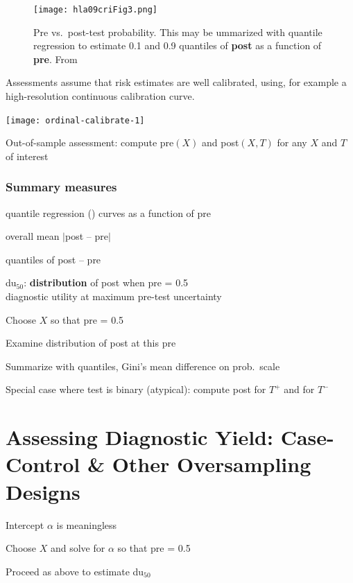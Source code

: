\begin{figure}[!htbp]\leavevmode
\centerline{\texttt{[image: hla09criFig3.png]}}
\caption{Pre vs.\ post-test probability.  This may be ummarized with quantile regression to estimate 0.1 and 0.9 quantiles of \textbf{post} as a function of \textbf{pre}.  From~\citet{hla09cri}}
\end{figure}

Assessments assume that risk estimates are well calibrated, using, for example a high-resolution continuous calibration curve.

\centerline{\texttt{[image: ordinal-calibrate-1]}}

Out-of-sample assessment: compute pre$(X)$ and post$(X,T)$ for
any $X$ and $T$ of interest
\subsubsection{Summary measures}
 \bi
 \item quantile regression {\smaller[2](\cite{koe78reg})} curves as a function of pre
 \item overall mean $|$post -- pre$|$
 \item quantiles of post -- pre
 \item du$_{50}$: \textbf{distribution} of post when pre = 0.5 \\
 diagnostic utility at maximum pre-test uncertainty 
  \bi
  \item Choose $X$ so that pre = 0.5
  \item Examine distribution of post at this pre
  \item Summarize with quantiles, Gini's mean difference on prob.\
 scale
  \item Special case where test is binary (atypical): compute post for
 $T^{+}$ and for $T^{-}$
  \ei
\ei

\section{Assessing Diagnostic Yield: Case-Control \& Other Oversampling Designs}
\bi
\item Intercept $\alpha$ is meaningless
\item Choose $X$ and solve for $\alpha$ so that pre = 0.5
\item Proceed as above to estimate du$_{50}$
\ei

